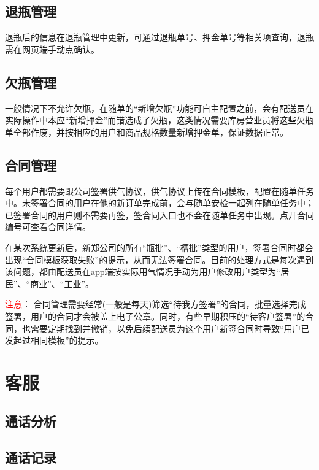 \documentclass[UTF8]{ctexart}
\begin{document}
\subsection{退瓶管理}

退瓶后的信息在退瓶管理中更新，可通过退瓶单号、押金单号等相关项查询，退瓶需在网页端手动点确认。

\subsection{欠瓶管理}

一般情况下不允许欠瓶，在随单的“新增欠瓶”功能可自主配置之前，会有配送员在实际操作中本应“新增押金”而错选成了欠瓶，这类情况需要库房营业员将这些欠瓶单全部作废，并按相应的用户和商品规格数量新增押金单，保证数据正常。

\subsection{合同管理}

每个用户都需要跟公司签署供气协议，供气协议上传在合同模板，配置在随单任务中。未签署合同的用户在他的新订单完成前，会与随单安检一起列在随单任务中；已签署合同的用户则不需要再签，签合同入口也不会在随单任务中出现。点开合同编号可查看合同详情。

在某次系统更新后，新郑公司的所有“瓶批”、“槽批”类型的用户，签署合同时都会出现“合同模板获取失败”的提示，从而无法签署合同。目前的处理方式是每次遇到该问题，都由配送员在app端按实际用气情况手动为用户修改用户类型为“居民”、“商业”、“工业”。

\textcolor{red}{注意}：
合同管理需要经常(一般是每天)筛选“待我方签署”的合同，批量选择完成签署，用户的合同才会被盖上电子公章。同时，有些早期积压的“待客户签署”的合同，也需要定期找到并撤销，以免后续配送员为这个用户新签合同时导致“用户已发起过相同模板”的提示。



\section{客服}

\subsection{通话分析}


\subsection{通话记录}
\end{document}

